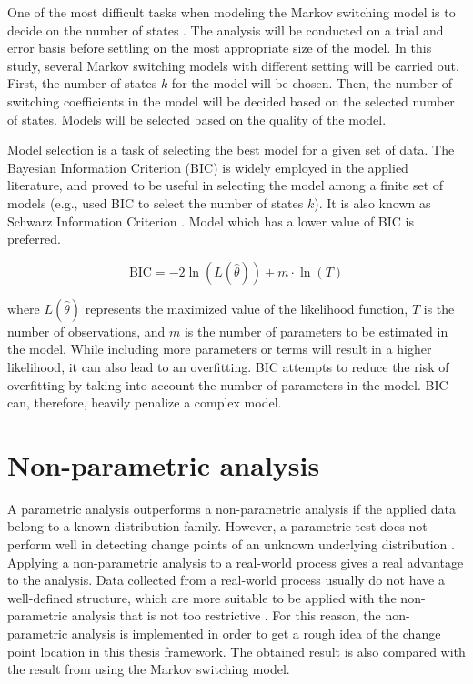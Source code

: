 One of the most difficult tasks when modeling the Markov switching
model is to decide on the number of states \citep{rabiner1986introduction}.
The analysis will be conducted on a trial and error basis before settling
on the most appropriate size of the model. In this study, several
Markov switching models with different setting will be carried out.
First, the number of states $k$ for the model will be chosen. Then,
the number of switching coefficients in the model will be decided
based on the selected number of states. Models will be selected based
on the quality of the model. 

Model selection is a task of selecting the best model for a given
set of data. The Bayesian Information Criterion (BIC) is widely employed
in the applied literature, and proved to be useful in selecting the
model among a finite set of models (e.g., \citet{leroux1992maximum}
used BIC to select the number of states $k$). It is also known as
Schwarz Information Criterion \citep{schwarz1978estimating}. Model
which has a lower value of BIC is preferred. 

\[
\mathrm{BIC}=-2\ln(L(\hat{\theta}))+m\cdot\ln(T)
\]

where $L(\hat{\theta})$ represents the maximized value of the likelihood
function, $T$ is the number of observations, and $m$ is the number
of parameters to be estimated in the model. While including more parameters
or terms will result in a higher likelihood, it can also lead to an
overfitting. BIC attempts to reduce the risk of overfitting by taking
into account the number of parameters in the model. BIC can, therefore,
heavily penalize a complex model. 

\section{Non-parametric analysis}

A parametric analysis outperforms a non-parametric analysis if the
applied data belong to a known distribution family. However, a parametric
test does not perform well in detecting change points of an unknown
underlying distribution \citep{sharkey2014nonparametric}. Applying
a non-parametric analysis to a real-world process gives a real advantage
to the analysis. Data collected from a real-world process usually
do not have a well-defined structure, which are more suitable to be
applied with the non-parametric analysis that is not too restrictive
\citep{hawkins2010nonparametric}. For this reason, the non-parametric
analysis is implemented in order to get a rough idea of the change
point location in this thesis framework. The obtained result is also
compared with the result from using the Markov switching model.


